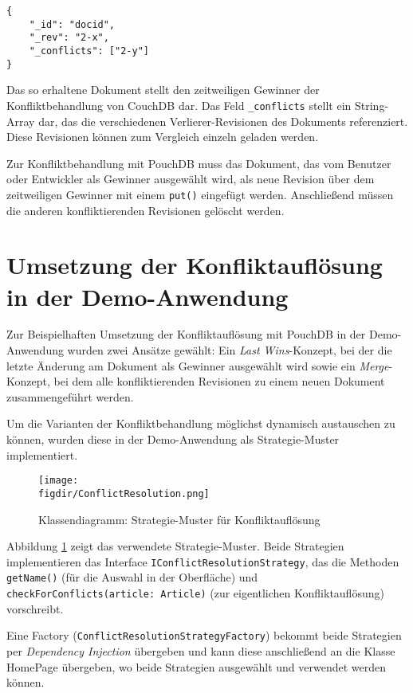 \begin{codebox}
	\begin{lstlisting}[style=typescript]
{
	"_id": "docid",
	"_rev": "2-x",
	"_conflicts": ["2-y"]
}
	\end{lstlisting}
\end{codebox}

Das so erhaltene Dokument stellt den zeitweiligen Gewinner der Konfliktbehandlung von CouchDB dar.
Das Feld \texttt{\_conflicts} stellt ein String-Array dar, das die verschiedenen Verlierer-Revisionen des Dokuments referenziert. Diese Revisionen können zum Vergleich einzeln geladen werden.

Zur Konfliktbehandlung mit PouchDB muss das Dokument, das vom Benutzer oder Entwickler als Gewinner ausgewählt wird, als neue Revision über dem zeitweiligen Gewinner mit einem \texttt{put()} eingefügt werden. Anschließend müssen die anderen konfliktierenden Revisionen gelöscht werden.

\section{Umsetzung der Konfliktauflösung in der Demo-Anwendung}

Zur Beispielhaften Umsetzung der Konfliktauflösung mit PouchDB in der Demo-Anwendung wurden zwei Ansätze gewählt: Ein \emph{Last Wins}-Konzept, bei der die letzte Änderung am Dokument als Gewinner ausgewählt wird sowie ein \emph{Merge}-Konzept, bei dem alle konfliktierenden Revisionen zu einem neuen Dokument zusammengeführt werden.

Um die Varianten der Konfliktbehandlung möglichst dynamisch austauschen zu können, wurden diese in der Demo-Anwendung als Strategie-Muster implementiert.

\begin{figure}[htb]
	\centering
	\caption{Klassendiagramm: Strategie-Muster für Konfliktauflösung}
	\label{fig:conflictresolutionstrategy}
	\texttt{[image: \\figdir/ConflictResolution.png]}
\end{figure}

Abbildung \ref{fig:conflictresolutionstrategy} zeigt das verwendete Strategie-Muster. Beide Strategien implementieren das Interface \texttt{IConflictResolutionStrategy}, das die Methoden \texttt{getName()} (für die Auswahl in der Oberfläche) und \texttt{checkForConflicts(article: Article)} (zur eigentlichen Konfliktauflösung) vorschreibt.

Eine Factory (\texttt{ConflictResolutionStrategyFactory}) bekommt beide Strategien per \emph{Dependency Injection} übergeben und kann diese anschließend an die Klasse HomePage übergeben, wo beide Strategien ausgewählt und verwendet werden können.